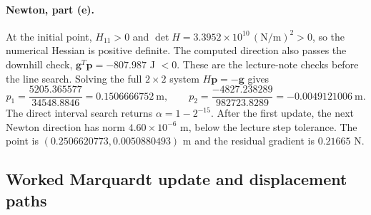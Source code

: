 \paragraph{Newton, part (e).}
At the initial point, $H_{11}>0$ and
$\det H=3.3952\times10^{10}\,(\mathrm{N/m})^2>0$, so the numerical
Hessian is positive definite. The computed direction also passes the
downhill check, $\bm g^T\bm p=-807.987$ J $<0$. These are the lecture-note
checks before the line search. Solving the full $2\times2$ system
$H\bm p=-\bm g$ gives
\[
p_1=\frac{5205.365577}{34548.8846}=0.1506666752\ \mathrm m,
\qquad
p_2=\frac{-4827.238289}{982723.8289}=-0.0049121006\ \mathrm m.
\]
The direct interval search returns $\alpha=1-2^{-15}$. After the first
update, the next Newton direction has norm $4.60\times10^{-6}$ m, below
the lecture step tolerance. The point is $(0.2506620773,0.0050880493)$ m
and the residual gradient is $0.21665$ N.

\clearpage
\subsection{Worked Marquardt update and displacement paths}
